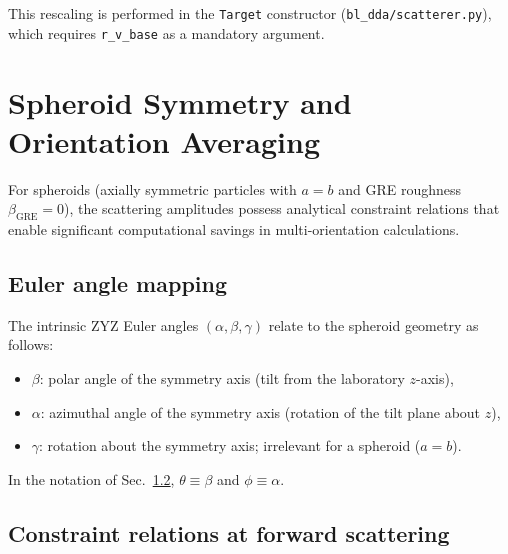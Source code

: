 \documentclass[11pt,a4paper]{article}
\begin{document}
This rescaling is performed in the \texttt{Target} constructor
(\texttt{bl\_dda/scatterer.py}), which requires \texttt{r\_v\_base}
as a mandatory argument.

\section{Spheroid Symmetry and Orientation Averaging}
\label{sec:spheroid}

For spheroids (axially symmetric particles with $a = b$ and GRE roughness
$\beta_{\mathrm{GRE}} = 0$), the scattering amplitudes possess analytical
constraint relations that enable significant computational savings in
multi-orientation calculations.

\subsection{Euler angle mapping}
\label{sec:spheroid-euler}

The intrinsic ZYZ Euler angles $(\alpha,\beta,\gamma)$ relate to the
spheroid geometry as follows:
\begin{itemize}
  \item $\beta$: polar angle of the symmetry axis
        (tilt from the laboratory $z$-axis),
  \item $\alpha$: azimuthal angle of the symmetry axis
        (rotation of the tilt plane about $z$),
  \item $\gamma$: rotation about the symmetry axis;
        irrelevant for a spheroid ($a = b$).
\end{itemize}
In the notation of Sec.~\ref{sec:spheroid-constraint},
$\theta \equiv \beta$ and $\phi \equiv \alpha$.

\subsection{Constraint relations at forward scattering}
\label{sec:spheroid-constraint}
\end{document}
